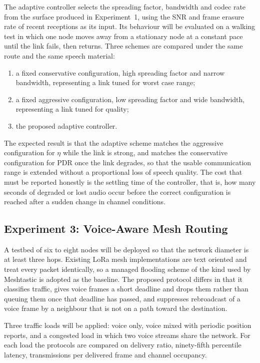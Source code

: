\documentclass[a4paper,10pt]{article}
\begin{document}
The adaptive controller selects the spreading factor, bandwidth and
codec rate from the surface produced in Experiment~1, using the SNR
and frame erasure rate of recent receptions as its input. Its
behaviour will be evaluated on a walking test in which one node moves
away from a stationary node at a constant pace until the link fails,
then returns. Three schemes are compared under the same route and the
same speech material:

\begin{enumerate}
\item a fixed conservative configuration, high spreading factor and
      narrow bandwidth, representing a link tuned for worst case
      range;
\item a fixed aggressive configuration, low spreading factor and wide
      bandwidth, representing a link tuned for quality;
\item the proposed adaptive controller.
\end{enumerate}

The expected result is that the adaptive scheme matches the aggressive
configuration for $\eta$ while the link is strong, and matches the
conservative configuration for PDR once the link degrades, so that the
usable communication range is extended without a proportional loss of
speech quality. The cost that must be reported honestly is the
settling time of the controller, that is, how many seconds of degraded
or lost audio occur before the correct configuration is reached after
a sudden change in channel conditions.

\subsection{Experiment 3: Voice-Aware Mesh Routing}

A testbed of six to eight nodes will be deployed so that the network
diameter is at least three hops. Existing LoRa mesh implementations
are text oriented and treat every packet identically, so a managed
flooding scheme of the kind used by Meshtastic is adopted as the
baseline. The proposed protocol differs in that it classifies traffic,
gives voice frames a short deadline and drops them rather than queuing
them once that deadline has passed, and suppresses rebroadcast of a
voice frame by a neighbour that is not on a path toward the
destination.

Three traffic loads will be applied: voice only, voice mixed with
periodic position reports, and a congested load in which two voice
streams share the network. For each load the protocols are compared on
delivery ratio, ninety-fifth percentile latency, transmissions per
delivered frame and channel occupancy.
\end{document}
